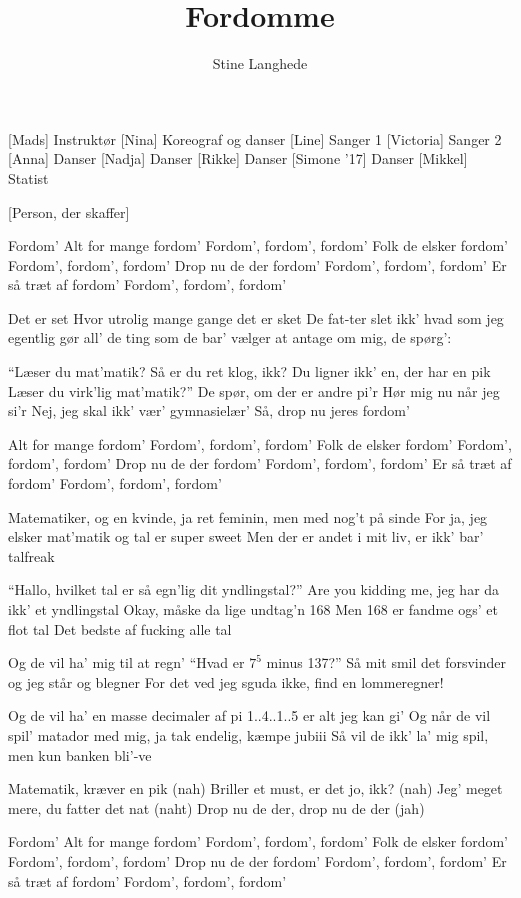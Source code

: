 \documentclass[a4paper,11pt]{article}
\title{Fordomme}
\author{Stine Langhede}
\begin{document}
\maketitle

\begin{roles}
[Mads] Instruktør
[Nina] Koreograf og danser
[Line] Sanger 1
[Victoria] Sanger 2
[Anna] Danser
[Nadja] Danser
[Rikke] Danser
[Simone '17] Danser
[Mikkel] Statist
\end{roles}

\begin{props}
[Person, der skaffer]
\end{props}


\begin{song}
%
Fordom'
Alt for mange fordom'
Fordom', fordom', fordom'
Folk de elsker fordom'
Fordom', fordom', fordom'
Drop nu de der fordom'
Fordom', fordom', fordom'
Er så træt af fordom'
Fordom', fordom', fordom'

%
Det er set
Hvor utrolig mange gange det er sket
De fat-ter slet ikk' hvad som jeg egentlig gør
all' de ting som de bar' vælger at antage om mig, de spørg':

``Læser du mat'matik?
Så er du ret klog, ikk?
Du ligner ikk' en, der har en pik
Læser du virk'lig mat'matik?''
De spør, om der er andre pi'r
Hør mig nu når jeg si'r
Nej, jeg skal ikk' vær' gymnasielær'
Så, drop nu jeres fordom'

%
Alt for mange fordom'
Fordom', fordom', fordom'
Folk de elsker fordom'
Fordom', fordom', fordom'
Drop nu de der fordom'
Fordom', fordom', fordom'
Er så træt af fordom'
Fordom', fordom', fordom'

%
Matematiker, og en kvinde,
ja ret feminin, men med nog't på sinde
For ja, jeg elsker mat'matik og tal er super sweet
Men der er andet i mit liv, er ikk' bar' talfreak

``Hallo, hvilket tal er så egn'lig dit yndlingstal?''
Are you kidding me, jeg har da ikk' et yndlingstal
Okay, måske da lige undtag'n 168
Men 168 er fandme ogs' et flot tal
Det bedste af fucking alle tal

Og de vil ha' mig til at regn'
``Hvad er $7^5$ minus 137?''
Så mit smil det forsvinder og jeg står og blegner
For det ved jeg sguda ikke, find en lommeregner!

Og de vil ha' en masse decimaler af pi
1..4..1..5 er alt jeg kan gi'
Og når de vil spil' matador med mig, ja tak endelig, kæmpe jubiii
Så vil de ikk' la' mig spil, men kun banken bli'-ve

Matematik, kræver en pik (nah)
Briller et must, er det jo, ikk? (nah)
Jeg' meget mere, du fatter det nat (naht)
Drop nu de der, drop nu de der (jah)

%
Fordom'
Alt for mange fordom'
Fordom', fordom', fordom'
Folk de elsker fordom'
Fordom', fordom', fordom'
Drop nu de der fordom'
Fordom', fordom', fordom'
Er så træt af fordom'
Fordom', fordom', fordom'
\end{song}
\end{document}

